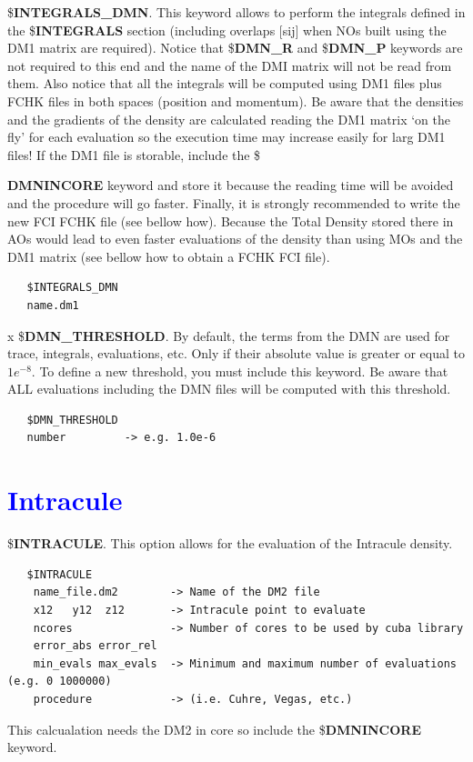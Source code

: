 \documentclass[10pt,a4paper]{article}
\newcommand{\tbl}[1]{{\textcolor{blue}{#1}}}
\begin{document}
\noindent \$\textbf{INTEGRALS\_DMN}. This keyword allows to perform the integrals defined in the \$\textbf{INTEGRALS} section (including overlaps $[$sij$]$ when NOs built using the DM1 matrix are required). Notice that \$\textbf{DMN\_R} and \$\textbf{DMN\_P} keywords are not required to this end and the name of the DMI matrix will not be read from them. Also notice that all the integrals will be computed using DM1 files plus FCHK files in both spaces (position and momentum). Be aware that the densities and the gradients of the density are calculated reading the DM1 matrix `on the fly' for each evaluation so the execution time may increase easily for larg DM1 files! If the DM1 file is storable, include the \${\textbf{DMNINCORE} keyword and store it because the reading time will be avoided and the procedure will go faster. Finally, it is strongly recommended to write the new FCI FCHK file (see bellow how). Because the Total Density stored there in AOs would lead to even faster evaluations of the density than using MOs and the DM1 matrix (see bellow how to obtain a FCHK FCI file). 
\begin{verbatim}
   $INTEGRALS_DMN
   name.dm1
\end{verbatim}
{\color{white} x}
\newline
\newline 
\noindent \$\textbf{DMN\_THRESHOLD}. By default, the terms from the DMN are used for trace, integrals, evaluations, etc. Only if their absolute value is greater or equal to $1e^{-8}$. To define a new threshold, you must include this keyword. Be aware that ALL evaluations including the DMN files will be computed with this threshold.
\begin{verbatim}
   $DMN_THRESHOLD
   number         -> e.g. 1.0e-6
\end{verbatim} 
\section{\tbl{\textbf{Intracule}}}
\noindent \$\textbf{INTRACULE}. This option allows for the evaluation of the Intracule density.\newline
\begin{verbatim}
   $INTRACULE
    name_file.dm2        -> Name of the DM2 file
    x12   y12  z12       -> Intracule point to evaluate 
    ncores               -> Number of cores to be used by cuba library
    error_abs error_rel    
    min_evals max_evals  -> Minimum and maximum number of evaluations (e.g. 0 1000000)
    procedure            -> (i.e. Cuhre, Vegas, etc.)
\end{verbatim}
This calcualation needs the DM2 in core so include the \$\textbf{DMNINCORE} keyword.
}
\end{document}
